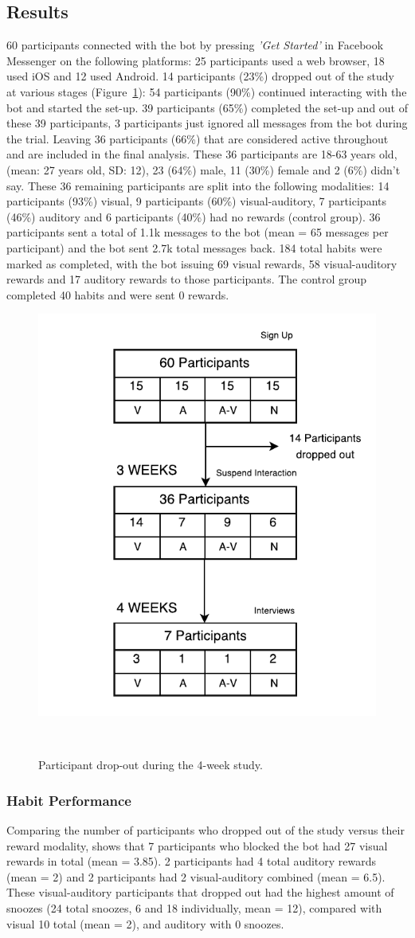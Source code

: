 \subsection{Results}
60 participants connected with the bot by pressing \textit{'Get Started'} in Facebook Messenger on the following platforms: 25 participants used a web browser, 18 used iOS and 12 used Android. 14 participants (23\%) dropped out of the study at various stages (Figure~\ref{fig:study_dropout}): 54 participants (90\%) continued interacting with the bot and started the set-up. 39 participants (65\%) completed the set-up and out of these 39 participants, 3 participants just ignored all messages from the bot during the trial. Leaving 36 participants (66\%) that are considered active throughout and are included in the final analysis. These 36 participants are 18-63 years old, (mean: 27 years old, SD: 12), 23 (64\%) male, 11 (30\%) female and 2 (6\%) didn't say. These 36 remaining participants are split into the following modalities: 14 participants (93\%) visual, 9 participants (60\%) visual-auditory, 7 participants (46\%) auditory and 6 participants (40\%) had no rewards (control group). 36 participants sent a total of 1.1k messages to the bot (mean = 65 messages per participant) and the bot sent 2.7k total messages back. 184 total habits were marked as completed, with the bot issuing 69 visual rewards, 58 visual-auditory rewards and 17 auditory rewards to those participants. The control group completed 40 habits and were sent 0 rewards.

\begin{figure}[H]
  \centering
  \includegraphics[width=.4\columnwidth]{resources/figures/study-flow.pdf}
  \caption{Participant drop-out during the 4-week study.}~\label{fig:study_dropout}
\end{figure}

\subsubsection*{Habit Performance}
Comparing the number of participants who dropped out of the study versus their reward modality, shows that 7 participants who blocked the bot had 27 visual rewards in total (mean = 3.85). 2 participants had 4 total auditory rewards (mean = 2) and 2 participants had 2 visual-auditory combined (mean = 6.5). These visual-auditory participants that dropped out had the highest amount of snoozes (24 total snoozes, 6 and 18 individually, mean = 12), compared with visual 10 total (mean = 2), and auditory with 0 snoozes.

